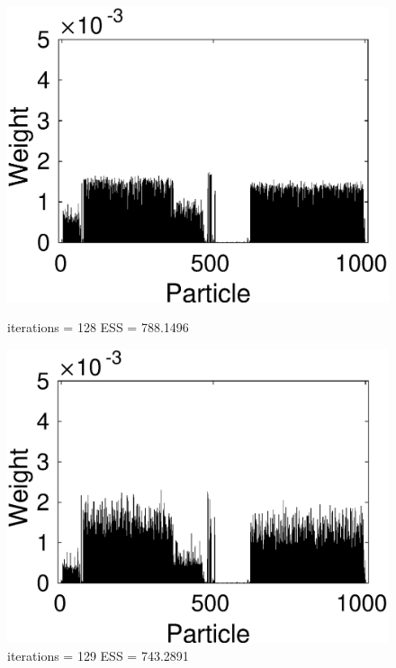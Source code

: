 \documentclass[12pt]{article}
\begin{document}
\begin{figure}[h!]
\begin{minipage}{0.5\textwidth}
		\includegraphics[scale = 0.5]{./Figures/128.eps}
		\caption*{iterations = 128 ESS = 788.1496}
	\end{minipage}%
	\begin{minipage}{0.5\textwidth}
		\centering
		\includegraphics[scale = 0.5]{./Figures/129.eps}
		\caption*{iterations = 129 ESS = 743.2891}
	\end{minipage}
	\begin{minipage}{0.5\textwidth}
		\centering

\end{minipage}
\end{figure}
\end{document}
